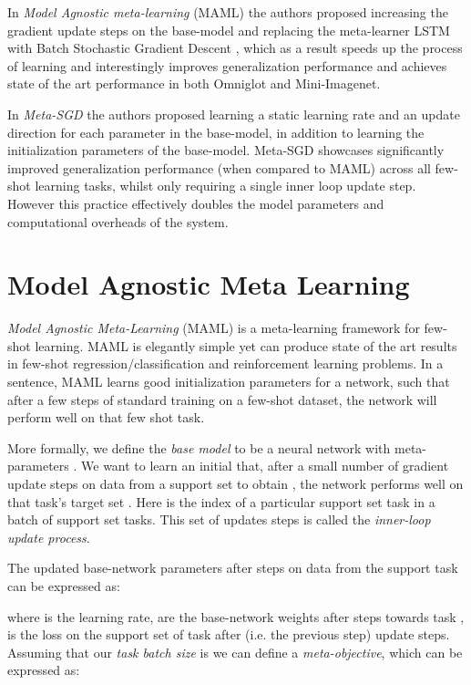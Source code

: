 \documentclass{article} \usepackage[dvipsnames]{xcolor}
\newcommand{\cut}[1]{}
\begin{document}
In \emph{Model Agnostic meta-learning} (MAML) \citep{finn2017model} the authors proposed increasing the gradient update steps on the base-model and replacing the meta-learner LSTM with Batch Stochastic Gradient Descent \citep{krizhevsky2012imagenet}, which as a result speeds up the process of learning and interestingly improves generalization performance and achieves state of the art performance in both Omniglot and Mini-Imagenet.

In \emph{Meta-SGD} \citep{li2017meta} the authors proposed learning a static learning rate and an update direction for each parameter in the base-model, in addition to learning the initialization parameters of the base-model. Meta-SGD showcases significantly improved generalization performance (when compared to MAML) across all few-shot learning tasks, whilst only requiring a single inner loop update step. However this practice effectively doubles the model parameters and computational overheads of the system.











\section{Model Agnostic Meta Learning}
\label{maml-definition}
\emph{Model Agnostic Meta-Learning} (MAML) \citep{finn2017model} is a meta-learning framework for few-shot learning. MAML is elegantly simple yet can produce state of the art results in few-shot regression/classification and reinforcement learning problems. In a sentence, MAML learns good initialization parameters for a network, such that after a few steps of standard training on a few-shot dataset, the network will perform well on that few shot task.


More formally, we define the \emph{base model} to be a neural network  with meta-parameters . We want to learn an initial  that, after a small number  of gradient update steps on data from a support set  to obtain , the network performs well on that task's target set . Here  is the index of a particular support set task in a batch of support set tasks.  This set of  updates steps is called the \emph{inner-loop update process}.


The updated base-network parameters after  steps on data from the support task  can be expressed as:

where  is the learning rate,  are the base-network weights after  steps towards task ,  is the loss on the support set of task  after  (i.e. the previous step) update steps.
Assuming \cut{our model takes  steps towards the support set loss before computing the target set loss, and }that our \emph{task batch size} is  we can define a \emph{meta-objective}, which can be expressed as:
\end{document}
